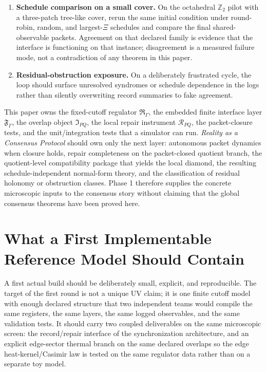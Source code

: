 \documentclass[11pt]{article}
\begin{document}
\begin{enumerate}[leftmargin=2em]
family.
\item \textbf{Schedule comparison on a small cover.}
On the octahedral $\mathbb Z_2$ pilot with a three-patch tree-like cover, rerun the same
initial condition under round-robin, random, and largest-$\Xi$ schedules and compare the final
shared-observable packets. Agreement on that declared family is evidence that the interface is
functioning on that instance; disagreement is a measured failure mode, not a contradiction of
any theorem in this paper.
\item \textbf{Residual-obstruction exposure.}
On a deliberately frustrated cycle, the loop should surface unresolved syndromes or schedule
dependence in the logs rather than silently overwriting record summaries to fake agreement.
\end{enumerate}

This paper owns the fixed-cutoff
regulator $\mathfrak R_{\Gamma}$, the embedded finite interface layer
$\mathfrak F_{\Gamma}$, the overlap object $\mathfrak I_{PQ}$, the local repair instrument
$\mathcal R_{PQ}$, the packet-closure tests, and the unit/integration tests that a simulator can
run. \emph{Reality as a Consensus Protocol} should own only the next layer: autonomous packet dynamics
when closure holds, repair completeness on the packet-closed quotient branch, the quotient-level
compatibility package that yields the local diamond, the resulting schedule-independent
normal-form theory, and the classification of residual holonomy or obstruction classes. Phase 1
therefore supplies the concrete microscopic inputs to the consensus story without claiming that
the global consensus theorems have been proved here.

\section{What a First Implementable Reference Model Should Contain}

A first actual build should be deliberately small, explicit, and reproducible. The target of the
first round is not a unique UV claim; it is one finite cutoff model with enough declared
structure that two independent teams would compile the same registers, the same layers, the same
logged observables, and the same validation tests. It should carry two coupled deliverables
on the same microscopic screen: the record/repair interface of the synchronization
architecture, and an explicit edge-sector thermal branch on the same declared overlaps so the
edge heat-kernel/Casimir law is tested on the same regulator data rather than on a separate toy
model.
\end{document}
